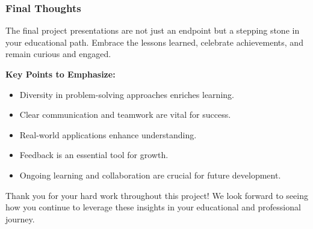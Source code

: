 \documentclass[aspectratio=169]{beamer}
\begin{document}
\begin{frame}[fragile]
    \frametitle{Final Thoughts}
    The final project presentations are not just an endpoint but a stepping stone in your educational path. Embrace the lessons learned, celebrate achievements, and remain curious and engaged.
    
    \textbf{Key Points to Emphasize:}
    \begin{itemize}
        \item Diversity in problem-solving approaches enriches learning.
        \item Clear communication and teamwork are vital for success.
        \item Real-world applications enhance understanding.
        \item Feedback is an essential tool for growth.
        \item Ongoing learning and collaboration are crucial for future development.
    \end{itemize}
    
    Thank you for your hard work throughout this project! We look forward to seeing how you continue to leverage these insights in your educational and professional journey.
\end{frame}
\end{document}
